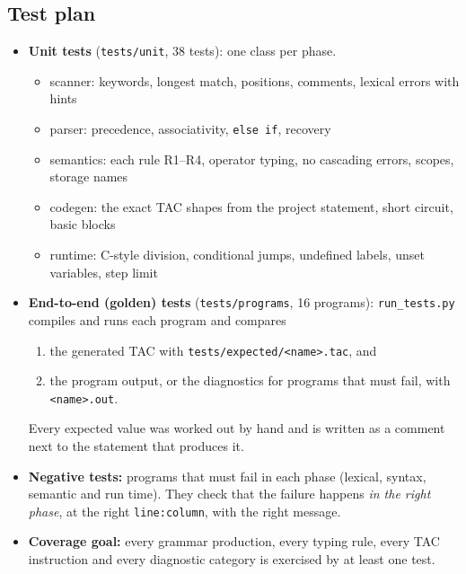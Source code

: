 \documentclass[11pt,letterpaper]{article}
\newcommand{\code}[1]{\texttt{#1}}
\begin{document}
\subsection{Test plan}
\begin{itemize}
  \item \textbf{Unit tests} (\code{tests/unit}, 38 tests): one class per phase.
  \begin{itemize}
    \item scanner: keywords, longest match, positions, comments, lexical errors with hints
    \item parser: precedence, associativity, \code{else if}, recovery
    \item semantics: each rule R1--R4, operator typing, no cascading errors, scopes, storage names
    \item codegen: the exact TAC shapes from the project statement, short circuit, basic blocks
    \item runtime: C-style division, conditional jumps, undefined labels, unset variables, step limit
  \end{itemize}
  \item \textbf{End-to-end (golden) tests} (\code{tests/programs}, 16 programs): \code{run\_tests.py} compiles and runs each program and compares
  \begin{enumerate}
    \item the generated TAC with \code{tests/expected/<name>.tac}, and
    \item the program output, or the diagnostics for programs that must fail, with \code{<name>.out}.
  \end{enumerate}
  Every expected value was worked out by hand and is written as a comment next to the statement that produces it.
  \item \textbf{Negative tests:} programs that must fail in each phase (lexical, syntax, semantic and run time). They check that the failure happens \emph{in the right phase}, at the right \code{line:column}, with the right message.
  \item \textbf{Coverage goal:} every grammar production, every typing rule, every TAC instruction and every diagnostic category is exercised by at least one test.
\end{itemize}
\end{document}
